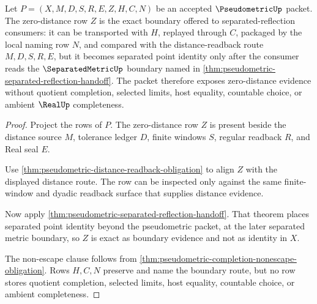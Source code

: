\begin{theorem}
\label{thm:pseudometric-zero-distance-separated-reflection-exactness}
Let $P=(X,M,D,S,R,E,Z,H,C,N)$ be an accepted $\PseudometricUp$ packet. The zero-distance row $Z$ is the exact boundary offered to separated-reflection consumers: it can be transported with $H$, replayed through $C$, packaged by the local naming row $N$, and compared with the distance-readback route $M,D,S,R,E$, but it becomes separated point identity only after the consumer reads the $\SeparatedMetricUp$ boundary named in \autoref{thm:pseudometric-separated-reflection-handoff}. The packet therefore exposes zero-distance evidence without quotient completion, selected limits, host equality, countable choice, or ambient $\RealUp$ completeness.
\end{theorem}
\begin{proof}
Project the rows of $P$. The zero-distance row $Z$ is present beside the distance source $M$, tolerance ledger $D$, finite windows $S$, regular readback $R$, and Real seal $E$.

Use \autoref{thm:pseudometric-distance-readback-obligation} to align $Z$ with the displayed distance route. The row can be inspected only against the same finite-window and dyadic readback surface that supplies distance evidence.

Now apply \autoref{thm:pseudometric-separated-reflection-handoff}. That theorem places separated point identity beyond the pseudometric packet, at the later separated metric boundary, so $Z$ is exact as boundary evidence and not as identity in $X$.

The non-escape clause follows from \autoref{thm:pseudometric-completion-nonescape-obligation}. Rows $H,C,N$ preserve and name the boundary route, but no row stores quotient completion, selected limits, host equality, countable choice, or ambient completeness.
\end{proof}

